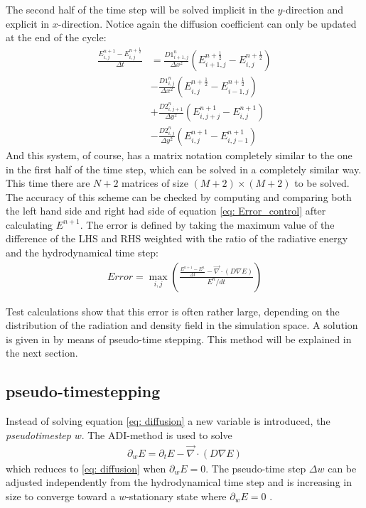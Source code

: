 The second half of the time step will be solved implicit in the $y$-direction and explicit in $x$-direction. Notice again the diffusion coefficient can only be updated at the end of the cycle:
\begin{align}
\frac{E_{i,j}^{n+1} - E_{i,j}^{n+\frac{1}{2}}}{\Delta t}
 &= \frac{D1_{i+1,j}^{n}}{\Delta x^2} (E_{i+1,j}^{n+\frac{1}{2}} - E_{i,j}^{n+\frac{1}{2}}) \\
 &- \frac{D1_{i,j}^{n}}{\Delta x^2} (E_{i,j}^{n+\frac{1}{2}} - E_{i-1,j}^{n+\frac{1}{2}}) \\
 &+ \frac{D2_{i,j+1}^{n}}{\Delta y^2} (E_{i,j+j}^{n+1} - E_{i,j}^{n+1}) \\
 &- \frac{D2_{i,j}^{n}}{\Delta y^2} (E_{i,j}^{n+1} - E_{i,j-1}^{n+1})
\end{align}
And this system, of course, has a matrix notation completely similar to the one in the first half of the time step, which can be solved in a completely similar way. This time there are $N+2$ matrices of size $(M+2) \times (M+2)$ to be solved. \\

The accuracy of this scheme can be checked by computing and comparing both the left hand side and right had side of equation \eqref{eq: Error_control} after calculating $E^{n+1}$. The error is defined by taking the maximum value of the difference of the LHS and RHS weighted with the ratio of the radiative energy and the hydrodynamical time step:
\begin{align}
Error = \max_{i,j} \left(\frac{\frac{E^{n+1} - E^{n}}{\Delta t} -  \vec{\nabla} \cdot \left(D \nabla E\right)}{E^{n}/dt} \right) \label{eq: Error}
\end{align}

 Test calculations show that this error is often rather large, depending on the distribution of the radiation and density field in the simulation space. A solution is given in \cite{Turner12001} by means of pseudo-time stepping. This method will be explained in the next section.
 
 
\subsection{pseudo-timestepping}
Instead of solving equation \eqref{eq: diffusion} a new variable is introduced, the \emph{pseudotimestep} $w$. The ADI-method is used to solve 
\begin{align}
\partial_w E = \partial_t E  - \vec{\nabla} \cdot \left(D \nabla E\right)
\end{align}
which reduces to \eqref{eq: diffusion} when $\partial_w E = 0$. The pseudo-time step $\Delta w$ can be adjusted independently from the hydrodynamical time step and is increasing in size to converge toward a $w$-stationary state where $\partial_w E = 0$ \cite{Turner12001}.\\

